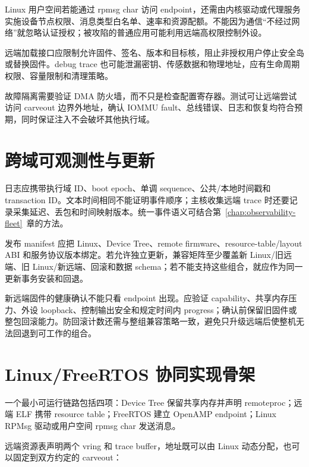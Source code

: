 Linux 用户空间若能通过 rpmsg char 访问 endpoint，还需由内核驱动或代理服务实施设备节点权限、消息类型白名单、速率和资源配额。不能因为通信“不经过网络”就忽略认证授权；被攻陷的普通应用可能利用远端高权限控制外设。

远端加载接口应限制允许固件、签名、版本和目标核，阻止非授权用户停止安全岛或替换固件。debug trace 也可能泄漏密钥、传感数据和物理地址，应有生命周期权限、容量限制和清理策略。

故障隔离需要验证 DMA 防火墙，而不只是检查配置寄存器。测试可让远端尝试访问 carveout 边界外地址，确认 IOMMU fault、总线错误、日志和恢复均符合预期，同时保证注入不会破坏其他执行域。

\section{跨域可观测性与更新}

日志应携带执行域 ID、boot epoch、单调 sequence、公共/本地时间戳和 transaction ID。文本时间相同不能证明事件顺序；主核收集远端 trace 时还要记录采集延迟、丢包和时间映射版本。统一事件语义可结合第~\ref{chap:observability-fleet}~章的方法。

发布 manifest 应把 Linux、Device Tree、remote firmware、resource-table/layout ABI 和服务协议版本绑定。若允许独立更新，兼容矩阵至少覆盖新 Linux/旧远端、旧 Linux/新远端、回滚和数据 schema；若不能支持这些组合，就应作为同一更新事务安装和回退。

新远端固件的健康确认不能只看 endpoint 出现。应验证 capability、共享内存压力、外设 loopback、控制输出安全和规定时间内 progress；确认前保留旧固件或整包回滚能力。防回滚计数还需与整组兼容策略一致，避免只升级远端后使整机无法回退到可工作的组合。

\section{Linux/FreeRTOS 协同实现骨架}

一个最小可运行链路包括四项：Device Tree 保留共享内存并声明 remoteproc；远端 ELF 携带 resource table；FreeRTOS 建立 OpenAMP endpoint；Linux RPMsg 驱动或用户空间 rpmsg char 发送消息。

远端资源表声明两个 vring 和 trace buffer，地址既可以由 Linux 动态分配，也可以固定到双方约定的 carveout：

